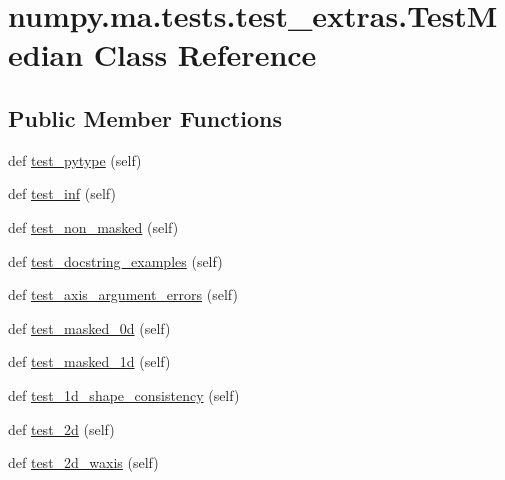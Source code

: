 \hypertarget{classnumpy_1_1ma_1_1tests_1_1test__extras_1_1TestMedian}{}\section{numpy.\+ma.\+tests.\+test\+\_\+extras.\+Test\+Median Class Reference}
\label{classnumpy_1_1ma_1_1tests_1_1test__extras_1_1TestMedian}
\subsection*{Public Member Functions}
\begin{DoxyCompactItemize}
\item 
def \hyperlink{classnumpy_1_1ma_1_1tests_1_1test__extras_1_1TestMedian_a9e91ae4e951e8a3febfe6cc04f121f2f}{test\+\_\+pytype} (self)
\item 
def \hyperlink{classnumpy_1_1ma_1_1tests_1_1test__extras_1_1TestMedian_a1ab682aa24d0783f2ee1589e9a40549a}{test\+\_\+inf} (self)
\item 
def \hyperlink{classnumpy_1_1ma_1_1tests_1_1test__extras_1_1TestMedian_a4b532712db4ea01dead13756e8239209}{test\+\_\+non\+\_\+masked} (self)
\item 
def \hyperlink{classnumpy_1_1ma_1_1tests_1_1test__extras_1_1TestMedian_ae39c524c9f2fa58a3b48b3908e9d54ed}{test\+\_\+docstring\+\_\+examples} (self)
\item 
def \hyperlink{classnumpy_1_1ma_1_1tests_1_1test__extras_1_1TestMedian_ac0650992fe11358fdee15c00396dd969}{test\+\_\+axis\+\_\+argument\+\_\+errors} (self)
\item 
def \hyperlink{classnumpy_1_1ma_1_1tests_1_1test__extras_1_1TestMedian_a058fab4e0ac439ea075a2b019b8a1a64}{test\+\_\+masked\+\_\+0d} (self)
\item 
def \hyperlink{classnumpy_1_1ma_1_1tests_1_1test__extras_1_1TestMedian_afa52fc84b47cdab73ad74a0296f5be2d}{test\+\_\+masked\+\_\+1d} (self)
\item 
def \hyperlink{classnumpy_1_1ma_1_1tests_1_1test__extras_1_1TestMedian_a5ac6e1cd9b3a1bedb017373a09cabde0}{test\+\_\+1d\+\_\+shape\+\_\+consistency} (self)
\item 
def \hyperlink{classnumpy_1_1ma_1_1tests_1_1test__extras_1_1TestMedian_a1af0c00cfc8c90fe8a94ae266ce338d0}{test\+\_\+2d} (self)
\item 
def \hyperlink{classnumpy_1_1ma_1_1tests_1_1test__extras_1_1TestMedian_a315325fb3d5b42f945237aa5436501e7}{test\+\_\+2d\+\_\+waxis} (self)

\end{DoxyCompactItemize}
